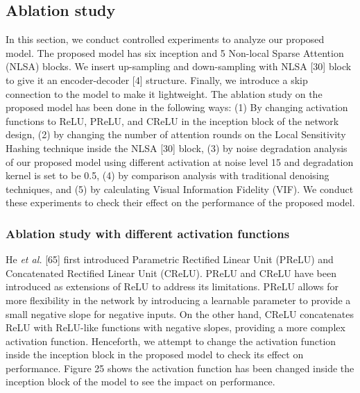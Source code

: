 \documentclass{ieeeaccess}
\begin{document}
\subsection{Ablation study}
In this section, we conduct controlled experiments to analyze our proposed model. The proposed model has six inception and 5 Non-local Sparse Attention (NLSA) blocks. We insert up-sampling and down-sampling with NLSA [30] block to give it an encoder-decoder [4] structure. Finally, we introduce a skip connection to the model to make it lightweight. The ablation study on the proposed model has been done in the following ways: (1) By changing activation functions to ReLU, PReLU, and CReLU in the inception block of the network design, (2) by changing the number of attention rounds on the Local Sensitivity Hashing technique inside the NLSA [30] block, (3) by noise degradation analysis of our proposed model using different activation at noise level 15 and degradation kernel is set to be 0.5, (4) by comparison analysis with traditional denoising techniques, and (5) by calculating Visual Information Fidelity (VIF). We conduct these experiments to check their effect on the performance of the proposed model. 

\subsubsection{Ablation study with different activation functions}

He \textit{et al.} [65] first introduced Parametric Rectified Linear Unit (PReLU) and Concatenated Rectified Linear Unit (CReLU). PReLU and CReLU have been introduced as extensions of ReLU to address its limitations. PReLU allows for more flexibility in the network by introducing a learnable parameter to provide a small negative slope for negative inputs. On the other hand, CReLU concatenates ReLU with ReLU-like functions with negative slopes, providing a more complex activation function. Henceforth, we attempt to change the activation function inside the inception block in the proposed model to check its effect on performance. Figure 25 shows the activation function has been changed inside the inception block of the model to see the impact on performance. 
\end{document}

